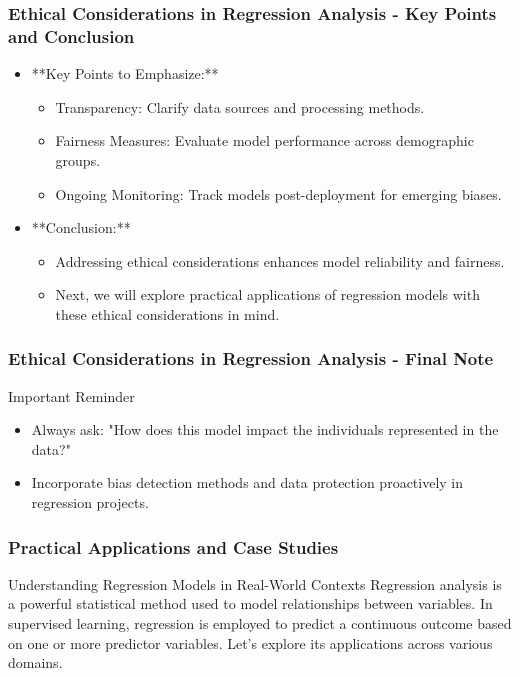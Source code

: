 \documentclass[aspectratio=169]{beamer}
\begin{document}
\begin{frame}[fragile]
    \frametitle{Ethical Considerations in Regression Analysis - Key Points and Conclusion}
    \begin{itemize}
        \item **Key Points to Emphasize:**
            \begin{itemize}
                \item Transparency: Clarify data sources and processing methods.
                \item Fairness Measures: Evaluate model performance across demographic groups.
                \item Ongoing Monitoring: Track models post-deployment for emerging biases.
            \end{itemize}
        \item **Conclusion:**
            \begin{itemize}
                \item Addressing ethical considerations enhances model reliability and fairness.
                \item Next, we will explore practical applications of regression models with these ethical considerations in mind.
            \end{itemize}
    \end{itemize}
\end{frame}

\begin{frame}[fragile]
    \frametitle{Ethical Considerations in Regression Analysis - Final Note}
    \begin{block}{Important Reminder}
        \begin{itemize}
            \item Always ask: "How does this model impact the individuals represented in the data?"
            \item Incorporate bias detection methods and data protection proactively in regression projects.
        \end{itemize}
    \end{block}
\end{frame}

\begin{frame}[fragile]
  \frametitle{Practical Applications and Case Studies}
  \begin{block}{Understanding Regression Models in Real-World Contexts}
    Regression analysis is a powerful statistical method used to model relationships between variables. In supervised learning, regression is employed to predict a continuous outcome based on one or more predictor variables. Let's explore its applications across various domains.
  \end{block}
\end{frame}
\end{document}
